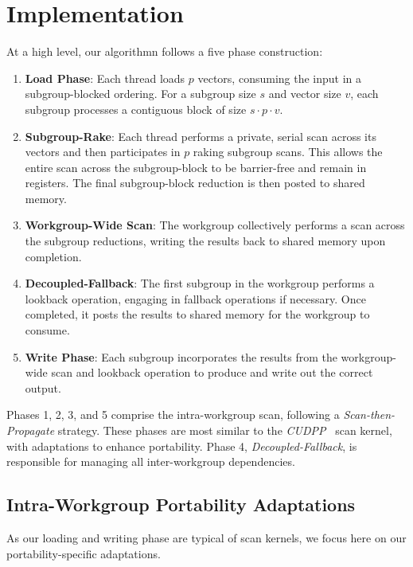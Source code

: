 \documentclass[sigconf]{acmart}
\begin{document}
\section{Implementation}
At a high level, our algorithmn follows a five phase construction:
\begin{enumerate} 
  \item \textbf{Load Phase}: Each thread loads $p$ vectors, consuming the input in a subgroup-blocked ordering. For a subgroup size $s$ and vector size $v$, each subgroup processes a contiguous block of size $s \cdot p \cdot v$. 
  \item \textbf{Subgroup-Rake}: Each thread performs a private, serial scan across its vectors and then participates in $p$ raking subgroup scans. This allows the entire scan across the subgroup-block to be barrier-free and remain in registers. The final subgroup-block reduction is then posted to shared memory. 
  \item \textbf{Workgroup-Wide Scan}: The workgroup collectively performs a scan across the subgroup reductions, writing the results back to shared memory upon completion. 
  \item \textbf{Decoupled-Fallback}: The first subgroup in the workgroup performs a lookback operation, engaging in fallback operations if necessary. Once completed, it posts the results to shared memory for the workgroup to consume. 
  \item \textbf{Write Phase}: Each subgroup incorporates the results from the workgroup-wide scan and lookback operation to produce and write out the correct output. 
\end{enumerate}
Phases 1, 2, 3, and 5 comprise the intra-workgroup scan, following a \emph{Scan-then-Propagate} strategy. These phases are most similar to the \emph{CUDPP}~\cite{} scan kernel, with adaptations to enhance portability. Phase 4, \emph{Decoupled-Fallback}, is responsible for managing all inter-workgroup dependencies.

\subsection{Intra-Workgroup Portability Adaptations}
As our loading and writing phase are typical of scan kernels, we focus here on our portability-specific adaptations. 
\end{document}
